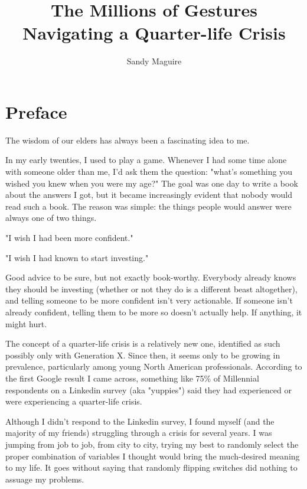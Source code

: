 \documentclass[]{book}
\title{\textbf{\LARGE The Millions of Gestures}\\{\Large Navigating a
Quarter-life Crisis}}
\author{Sandy Maguire}
\date{}
\begin{document}
\frontmatter
\maketitle

\tableofcontents

\linenumbers

\show{\chapter}

\chapter*{Preface}

The wisdom of our elders has always been a fascinating idea to me.

In my early twenties, I used to play a game. Whenever I had some time alone with
someone older than me, I'd ask them the question: "what's something you wished
you knew when you were my age?" The goal was one day to write a book about the
answers I got, but it became increasingly evident that nobody would read such a
book. The reason was simple: the things people would answer were always one of
two things.

"I wish I had been more confident."

"I wish I had known to start investing."

Good advice to be sure, but not exactly book-worthy. Everybody already knows
they should be investing (whether or not they do is a different beast
altogether), and telling someone to be more confident isn't very actionable. If
someone isn't already confident, telling them to be more so doesn't actually
help. If anything, it might hurt.

 The concept of a quarter-life crisis is a relatively
new one, identified as such possibly only with Generation X. Since then, it
seems only to be growing in prevalence, particularly among young North American
professionals. According to the first Google result I came across, something
like 75\% of Millennial respondents on a Linkedin survey (aka "yuppies") said
they had experienced or were experiencing a quarter-life crisis.

Although I didn't respond to the Linkedin survey, I found myself (and the
majority of my friends) struggling through a crisis for several years. I was
jumping from job to job, from city to city, trying my best to randomly select
the proper combination of variables I thought would bring the much-desired
meaning to my life. It goes without saying that randomly flipping switches did
nothing to assuage my problems.
\end{document}
